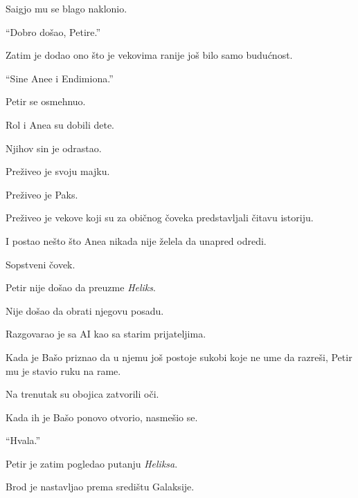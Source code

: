 \bigskip

Saigjo mu se blago naklonio.

\bigskip

``Dobro došao, Petire.''

\bigskip

Zatim je dodao ono što je vekovima ranije još bilo samo budućnost.

\bigskip

``Sine Anee i Endimiona.''

\bigskip

Petir se osmehnuo.

\bigskip

Rol i Anea su dobili dete.

\bigskip

Njihov sin je odrastao.

\bigskip

Preživeo je svoju majku.

Preživeo je Paks.

Preživeo je vekove koji su za običnog čoveka predstavljali čitavu istoriju.

\bigskip

I postao nešto što Anea nikada nije želela da unapred odredi.

\bigskip

Sopstveni čovek.

\bigskip

Petir nije došao da preuzme \emph{Heliks}.

\bigskip

Nije došao da obrati njegovu posadu.

\bigskip

Razgovarao je sa AI kao sa starim prijateljima.

\bigskip

Kada je Bašo priznao da u njemu još postoje sukobi koje ne ume da razreši, Petir mu je stavio ruku na rame.

\bigskip

Na trenutak su obojica zatvorili oči.

\bigskip

Kada ih je Bašo ponovo otvorio, nasmešio se.

\bigskip

``Hvala.''

\bigskip

Petir je zatim pogledao putanju \emph{Heliksa}.

\bigskip

Brod je nastavljao prema središtu Galaksije.

